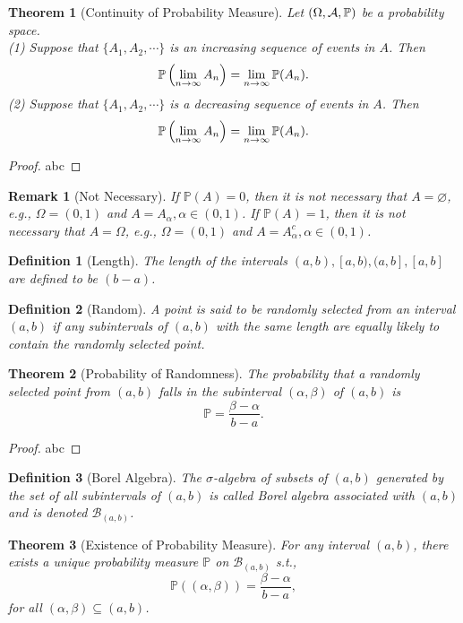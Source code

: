 \documentclass[openany,12pt]{book}
\newtheorem{theorem}{Theorem}[chapter]
\newtheorem{remark}{Remark}[chapter]
\newtheorem{definition}{Definition}[chapter]
\begin{document}
\begin{theorem}[Continuity of Probability Measure]
  Let $(\Omega,\mathcal{A},\mathbb{P})$ be a probability space.\\
  (1) Suppose that $\{A_1,A_2,\cdots\}$ is an increasing sequence of events in $A$. Then $$\mathbb{P}\left(\lim_{n\to\infty} A_n\right)=\lim_{n\to\infty} \mathbb{P}(A_n).$$
  (2) Suppose that $\{A_1,A_2,\cdots\}$ is a decreasing sequence of events in $A$. Then $$\mathbb{P}\left(\lim_{n\to\infty} A_n\right)=\lim_{n\to\infty} \mathbb{P}(A_n).$$
\end{theorem}

\begin{proof}
  abc
\end{proof}

\begin{remark}[Not Necessary]
  If $\mathbb{P}(A)=0$, then it is not necessary that $A=\varnothing$, e.g., $\Omega=(0,1)$ and $A=A_\alpha, \alpha\in(0,1)$.
  If $\mathbb{P}(A)=1$, then it is not necessary that $A=\Omega$, e.g., $\Omega=(0,1)$ and $A=A_\alpha^c, \alpha\in(0,1)$.
\end{remark}

\begin{definition}[Length]
  The length of the intervals $(a,b), [a,b), (a,b], [a,b]$ are defined to be $(b-a)$.
\end{definition}

\begin{definition}[Random]
  A point is said to be randomly selected from an interval $(a,b)$ if any subintervals of $(a,b)$ with the same length are equally likely to contain the randomly selected point.
\end{definition}

\begin{theorem}[Probability of Randomness]
  The probability that a randomly selected point from $(a,b)$ falls in the subinterval $(\alpha,\beta)$ of $(a,b)$ is $$\mathbb{P}=\frac{\beta-\alpha}{b-a}.$$
\end{theorem}

\begin{proof}
  abc
\end{proof}

\begin{definition}[Borel Algebra]
  The $\sigma$-algebra of subsets of $(a,b)$ generated by the set of all subintervals of $(a,b)$ is called Borel algebra associated with $(a,b)$ and is denoted $\mathcal{B}_{(a,b)}$.
\end{definition}

\begin{theorem}[Existence of Probability Measure]
  For any interval $(a,b)$, there exists a unique probability measure $\mathbb{P}$ on $\mathcal{B}_{(a,b)}$ s.t., $$\mathbb{P}((\alpha,\beta))=\frac{\beta-\alpha}{b-a},$$
  for all $(\alpha,\beta)\subseteq(a,b)$.
\end{theorem}
\end{document}
